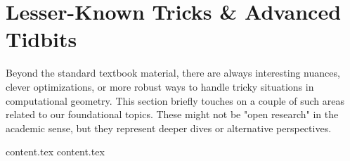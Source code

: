 \clearpage
\section{Lesser-Known Tricks \& Advanced Tidbits}
\label{sec:A.7}

Beyond the standard textbook material, there are always interesting nuances, clever optimizations, or more robust ways to handle tricky situations in computational geometry. This section briefly touches on a couple of such areas related to our foundational topics. These might not be "open research" in the academic sense, but they represent deeper dives or alternative perspectives.

{content.tex}
{content.tex}